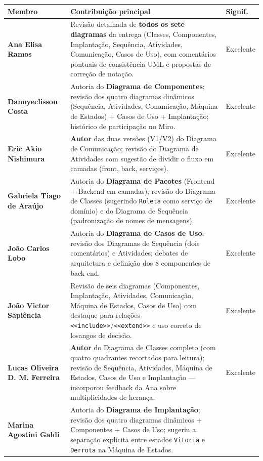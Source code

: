 \documentclass[11pt,a4paper]{article}
\begin{document}
\renewcommand{\arraystretch}{1.25}
\begin{longtable}{|p{3.8cm}|p{9.3cm}|p{1.8cm}|}
\hline
\rowcolor{bcBlue!15}
\textbf{Membro} & \textbf{Contribuição principal} & \textbf{Signif.} \\
\hline
\endhead
\textbf{Ana Elisa Ramos} &
Revisão detalhada de \textbf{todos os sete diagramas} da entrega (Classes, Componentes, Implantação, Sequência, Atividades, Comunicação, Casos de Uso), com comentários pontuais de consistência UML e propostas de correção de notação.
& Excelente \\ \hline
\textbf{Dannyeclisson Costa} &
Autoria do \textbf{Diagrama de Componentes}; revisão dos quatro diagramas dinâmicos (Sequência, Atividades, Comunicação, Máquina de Estados) + Casos de Uso + Implantação; histórico de participação no Miro.
& Excelente \\ \hline
\textbf{Eric Akio Nishimura} &
\textbf{Autor} das duas versões (V1/V2) do Diagrama de Comunicação; revisão do Diagrama de Atividades com sugestão de dividir o fluxo em camadas (front, back, serviços).
& Excelente \\ \hline
\textbf{Gabriela Tiago de Araújo} &
Autoria do \textbf{Diagrama de Pacotes} (Frontend + Backend em camadas); revisão do Diagrama de Classes (sugerindo \texttt{Roleta} como serviço de domínio) e do Diagrama de Sequência (padronização de nomes de mensagens).
& Excelente \\ \hline
\textbf{João Carlos Lobo} &
Autoria do \textbf{Diagrama de Casos de Uso}; revisão dos Diagramas de Sequência (dois comentários) e Atividades; debates de arquitetura e definição dos 8 componentes de back-end.
& Excelente \\ \hline
\textbf{João Victor Sapiência} &
Revisão de seis diagramas (Componentes, Implantação, Atividades, Comunicação, Máquina de Estados, Casos de Uso) com destaque para relações \texttt{<<include>>}/\texttt{<<extend>>} e uso correto de losangos de decisão.
& Excelente \\ \hline
\textbf{Lucas Oliveira D. M. Ferreira} &
\textbf{Autor} do Diagrama de Classes completo (com quatro quadrantes recortados para leitura); revisão de Sequência, Atividades, Máquina de Estados, Casos de Uso e Implantação --- incorporou feedback da Ana sobre multiplicidades de herança.
& Excelente \\ \hline
\textbf{Marina Agostini Galdi} &
Autoria do \textbf{Diagrama de Implantação}; revisão dos quatro diagramas dinâmicos + Componentes + Casos de Uso; sugeriu a separação explícita entre estados \texttt{Vitoria} e \texttt{Derrota} na Máquina de Estados.

\end{longtable}
\end{document}
